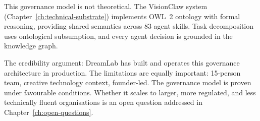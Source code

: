 \begin{keyinsight}[title={The VisionClaw Evidence}]
This governance model is not theoretical. The VisionClaw system (Chapter~\ref{ch:technical-substrate}) implements OWL~2 ontology with formal reasoning, providing shared semantics across 83 agent skills. Task decomposition uses ontological subsumption, and every agent decision is grounded in the knowledge graph.

The credibility argument: DreamLab has built and operates this governance architecture in production. The limitations are equally important: 15-person team, creative technology context, founder-led. The governance model is proven under favourable conditions. Whether it scales to larger, more regulated, and less technically fluent organisations is an open question addressed in Chapter~\ref{ch:open-questions}.
\end{keyinsight}
